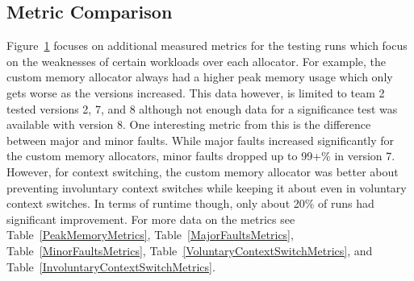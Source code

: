 \subsection{Metric Comparison}

\begin{figure}[H]
\centering
{}
\caption{}
\label{fig:metric-outcomes}
\end{figure}

Figure~\ref{fig:metric-outcomes} focuses on additional measured metrics for the testing runs which focus on the weaknesses of certain workloads over each allocator. For example, the custom memory allocator always had a higher peak memory usage which only gets worse as the versions increased. This data however, is limited to team 2 tested versions 2, 7, and 8 although not enough data for a significance test was available with version 8.
One interesting metric from this is the difference between major and minor faults. While major faults increased significantly for the custom memory allocators, minor faults dropped up to 99+\% in version 7. However, for context switching, the custom memory allocator was better about preventing involuntary context switches while keeping it  about even in voluntary context switches.
In terms of runtime though, only about 20\% of runs had significant improvement.
For more data on the metrics see Table~\ref{PeakMemoryMetrics}, Table~\ref{MajorFaultsMetrics}, Table~\ref{MinorFaultsMetrics}, Table~\ref{VoluntaryContextSwitchMetrics}, and Table~\ref{InvoluntaryContextSwitchMetrics}.

